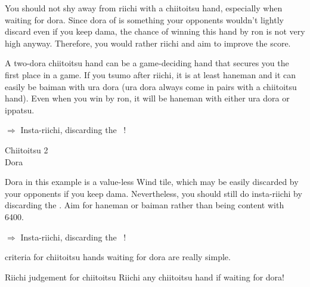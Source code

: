 \noindent You should not shy away from {\jap riichi} with a {\jap chiitoitsu} hand, especially when waiting for {\jap dora}. Since {\jap dora} of {\large {}} is something your opponents wouldn't lightly discard even if you keep {\jap dama}, the chance of winning this hand by {\jap ron} is not very high anyway. Therefore, you would rather {\jap riichi} and aim to improve the score. 

\bigskip
A two-{\jap dora} {\jap chiitoitsu} hand can be a game-deciding hand that secures you the first place in a game. If you {\jap tsumo} after {\jap riichi}, it is at least {\jap haneman} and it can easily be {\jap baiman} with {\jap ura dora} ({\jap ura dora} always come in pairs with a {\jap chiitoitsu} hand). Even when you win by {\jap ron}, it will be {\jap haneman} with either {\jap ura dora} or {\jap ippatsu}. 

\begin{center}
{\large $\Rightarrow$ Insta-{\jap riichi}, discarding the ~!}
\end{center}

\bigskip
\begin{itembox}[r]{{\jap Chiitoitsu 2}}
\bp
{}\xi{}\zhong\zhong\fa\fa~~\xi\\
\hspace{310pt}\footnotesize{\jap Dora}
\ep
\vspace{-15pt}
\end{itembox}
{\jap Dora} in this example is a value-less Wind tile, which may be easily discarded by your opponents if you keep {\jap dama}. Nevertheless, you should still do insta-{\jap riichi} by discarding the {\large {}}. Aim for {\jap haneman} or {\jap baiman} rather than being content with 6400. 

\begin{center}
{\large $\Rightarrow$ Insta-{\jap riichi}, discarding the ~!}
\end{center}

\bigskip

 criteria for {\jap chiitoitsu} hands waiting for {\jap dora} are really simple. 

\begin{itembox}[c]{{\jap Riichi} judgement for {\jap chiitoitsu}}
{\jap Riichi} any {\jap chiitoitsu} hand if waiting for {\jap dora}!
\end{itembox}

\bigskip

